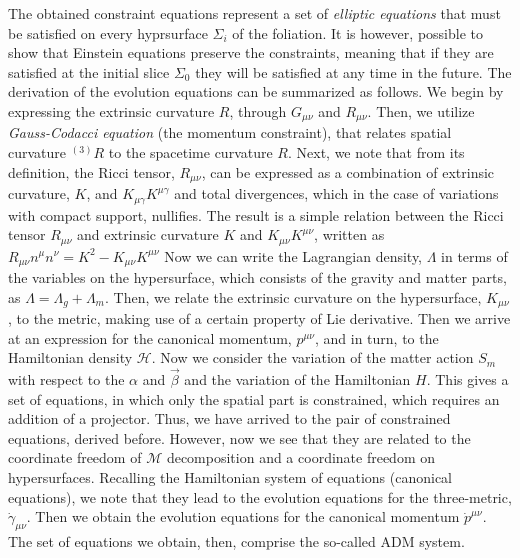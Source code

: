 The obtained constraint equations represent a set of \textit{elliptic equations} that must be satisfied on every hyprsurface $\Sigma_i$ of the foliation. 
It is however, possible to show that Einstein equations preserve the constraints, meaning that if they are satisfied at the initial slice $\Sigma_0$ they will be satisfied at any time in the future. 
The derivation of the evolution equations can be summarized as follows. 
We begin by expressing the extrinsic curvature $R$, through $G_{\mu\nu}$ and $R_{\mu\nu}$. 
Then, we utilize \textit{Gauss-Codacci equation} (the momentum constraint), that relates spatial curvature $^{(3)}R$ to the spacetime curvature $R$.
Next, we note that from its definition, the Ricci tensor, $R_{\mu\nu}$, can be expressed as a combination of extrinsic curvature, $K$, and $K_{\mu\gamma}K^{\mu\gamma}$ and total divergences, which in the case of variations with compact support, nullifies. 
The result is a simple relation between the Ricci tensor $R_{\mu\nu}$ and extrinsic curvature $K$ and $K_{\mu\nu}K^{\mu\nu}$, written as 
$R_{\mu\nu}n^{\mu}n^{\nu}= K^2 - K_{\mu\nu}K^{\mu\nu}$
Now we can write the Lagrangian density, $\Lambda$ in terms of the variables on the hypersurface, which consists of the gravity and matter parts, as $\Lambda = \Lambda_g+\Lambda_m$. 
Then, we relate the extrinsic curvature on the hypersurface, $K_{\mu\nu}$, to the metric, making use of a certain property of Lie derivative. 
Then we arrive at an expression for the canonical momentum, $p^{\mu\nu}$, and in turn, to the Hamiltonian density $\mathcal{H}$.
Now we consider the variation of the matter action $S_m$ with respect to the $\alpha$ and $\vec{\beta}$ and the variation of the Hamiltonian $H$.
This gives a set of equations, in which only the spatial part is constrained, which requires an addition of a projector. Thus, we have arrived to the pair of constrained equations, derived before. However, now we see that they are related to the coordinate freedom of $\mathcal{M}$ decomposition and a coordinate freedom on hypersurfaces.
Recalling the Hamiltonian system of equations (canonical equations), we note that they lead to the evolution equations for the three-metric, $\dot{\gamma}_{\mu\nu}$. Then we obtain the evolution equations for the canonical momentum $\dot{p}^{\mu\nu}$. The set of equations we obtain, then, comprise the so-called ADM system.
